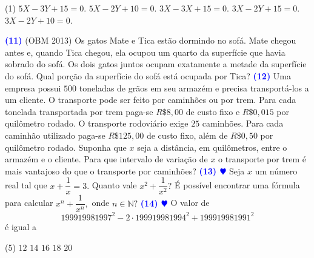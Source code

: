 \documentclass[12pt, a4paper]{article}
\newcommand{\negrito}[1]{\mbox{\boldmath{$#1$}}}
\begin{document}
\begin{tasks}[counter-format={(tsk[a])},label-width=3.6ex, label-format = {\bfseries}, column-sep = {0pt}](1)
\task[\textcolor{Floresta}{$\negrito{(a)} $}] $5X - 3Y + 15 = 0.$
\task[\textcolor{Floresta}{$\negrito{(b)} $}] $5X - 2Y + 10 = 0.$
\task[\textcolor{Floresta}{$\negrito{(c)} $}] $3X - 3X + 15 = 0.$
\task[\textcolor{Floresta}{$\negrito{(d)} $}] $3X-2Y+15 = 0.$
\task[\textcolor{Floresta}{$\negrito{(e)} $}] $3X - 2Y + 10 = 0.$
\end{tasks}
\textcolor{blue}{\bf(11)} (OBM 2013) Os gatos Mate e Tica estão dormindo no sofá. Mate chegou antes e, quando Tica chegou, ela ocupou um quarto da superfície que havia sobrado do sofá. Os dois gatos
juntos ocupam exatamente a metade da superfície do sofá. Qual porção da superfície do sofá está ocupada por Tica?
\newline
\newline
\textcolor{blue}{\bf(12)} Uma empresa possui $500$ toneladas de grãos em seu armazém e precisa transportá-los a um cliente. O transporte pode ser feito por caminhões ou por trem. Para cada
tonelada transportada por trem paga-se $R\$ 8,00$ de custo fixo e $R\$ 0,015$ por
quilômetro rodado. O transporte rodoviário exige $25$ caminhões. Para cada caminhão
utilizado paga-se $R\$ 125,00$ de custo fixo, além de $R\$ 0,50$ por quilômetro rodado.
Suponha que $x$ seja a distância, em quilômetros, entre o armazém e o cliente. Para que
intervalo de variação de $x$ o transporte por trem é mais vantajoso do que o transporte
por caminhões?
\newline\newline
\textcolor{blue}{\bf(13) $\varheart$} Seja $x$ um número real tal que $x + \dfrac{1}{x} = 3.$ Quanto vale $x^2 + \dfrac{1}{x^2}?$ É possível encontrar uma fórmula para calcular $x^n + \dfrac{1}{x^n},$ onde $n \in \mathbb{N}?$
\newline\newline
\textcolor{blue}{\bf(14) $\varheart$} O valor de
\[
199919981997^2 - 2 \cdot 199919981994^2 + 199919981991^2
\]
é igual a
\begin{tasks}[counter-format={(tsk[a])},label-width=3.6ex, label-format = {\bfseries}, column-sep = {0pt}](5)
\task[\textcolor{Floresta}{$\negrito{(a)} $}] $12$
\task[\textcolor{Floresta}{$\negrito{(b)} $}] $14$ 
\task[\textcolor{Floresta}{$\negrito{(c)} $}] $16$
\task[\textcolor{Floresta}{$\negrito{(d)} $}] $18$
\task[\textcolor{Floresta}{$\negrito{(e)} $}] $20$
\end{tasks}
\end{document}
